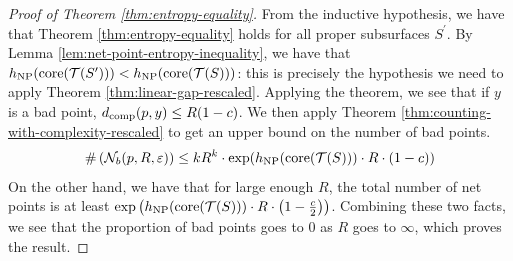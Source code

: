 \documentclass[12pt, reqno]{amsart}
\begin{document}
\begin{proof}[Proof of Theorem \ref{thm:entropy-equality}]
  From the inductive hypothesis, we have that Theorem \ref{thm:entropy-equality} holds for all proper subsurfaces $S^{\prime}$.
  By Lemma \ref{lem:net-point-entropy-inequality}, we have that $h_{\mathrm{NP}}(\mathrm{core}(\mathcal{T}(S^{\prime}))) < h_{\mathrm{NP}}(\mathrm{core}(\mathcal{T}(S)))$: this is precisely the hypothesis we need to apply Theorem \ref{thm:linear-gap-rescaled}.
  Applying the theorem, we see that if $y$ is a bad point, $d_{\mathrm{comp}}(p, y) \leq R(1 - c)$.
  We then apply Theorem \ref{thm:counting-with-complexity-rescaled} to get an upper bound on the number of bad points.
  \begin{align*}
    \#\left( \mathcal{N}_b(p, R, \varepsilon) \right) \leq kR^k \cdot \exp(h_{\mathrm{NP}}(\mathrm{core}(\mathcal{T}(S))) \cdot R \cdot (1 - c))
  \end{align*}
  On the other hand, we have that for large enough $R$, the total number of net points is at least $\exp\left(h_{\mathrm{NP}}(\mathrm{core}(\mathcal{T}(S))) \cdot R \cdot \left(1 - \frac{c}{2}\right)\right)$.
  Combining these two facts, we see that the proportion of bad points goes to $0$ as $R$ goes to $\infty$, which proves the result.
\end{proof}


\end{document}
